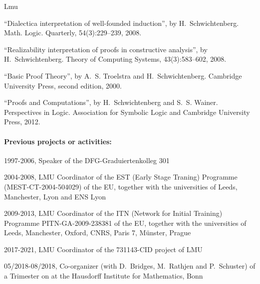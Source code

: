 \begin{sitedescription}{Lmu}
\begin{compactitem}
\item ``Dialectica interpretation of well-founded induction'',
  by H.~Schwichtenberg.
Math. Logic. Quarterly, 54(3):229--239, 2008.

\item ``Realizability interpretation of proofs in constructive analysis'',
  by H.~Schwichtenberg.
 Theory of Computing Systems, 43(3):583--602, 2008.

\item ``Basic Proof Theory'',
  by A.~S. Troelstra and H.~Schwichtenberg.
 Cambridge University Press, second edition, 2000.

\item ``Proofs and Computations'',
  by H.~Schwichtenberg and S.~S. Wainer.
Perspectives in Logic. Association for Symbolic Logic and Cambridge
  University Press, 2012.
\end{compactitem}

\paragraph*{Previous projects or activities:}

\begin{compactitem}
  \item 1997-2006, Speaker of the DFG-Graduiertenkolleg 301

\item 2004-2008, LMU Coordinator of the  EST (Early Stage Traning) Programme
   (MEST-CT-2004-504029) of the EU, together with the
universities of Leeds, Manchester, Lyon and ENS Lyon

\item 2009-2013, LMU Coordinator of the ITN (Network for Initial
    Training) Programme PITN-GA-2009-238381  of the
    EU, together with the universities of Leeds, Manchester, Oxford,
    CNRS, Paris 7, M\"unster, Prague

\item 2017-2021, LMU Coordinator of the 731143-CID project of LMU

\item 05/2018-08/2018, Co-organizer (with D.~Bridges, M.~Rathjen and
  P.~Schuster) of a Trimester on 
  at the Hausdorff Institute for Mathematics, Bonn
\end{compactitem}


\end{sitedescription}
